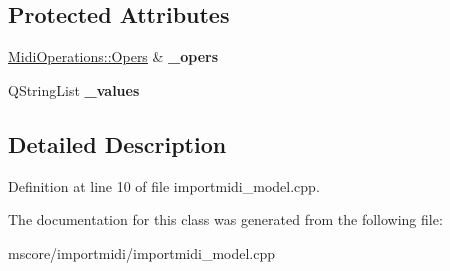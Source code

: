 \subsection*{Protected Attributes}
\begin{DoxyCompactItemize}
\item 
\mbox{\label{class_ms_1_1_tracks_model_1_1_column_aaec6eb8c90392202926a00e3ba881380}} 
\hyperlink{struct_ms_1_1_midi_operations_1_1_opers}{Midi\+Operations\+::\+Opers} \& {\bfseries \+\_\+opers}
\item 
\mbox{\label{class_ms_1_1_tracks_model_1_1_column_a35f4c785171edb22850890b218516f2c}} 
Q\+String\+List {\bfseries \+\_\+values}
\end{DoxyCompactItemize}


\subsection{Detailed Description}


Definition at line 10 of file importmidi\+\_\+model.\+cpp.



The documentation for this class was generated from the following file\+:\begin{DoxyCompactItemize}
\item 
mscore/importmidi/importmidi\+\_\+model.\+cpp\end{DoxyCompactItemize}
